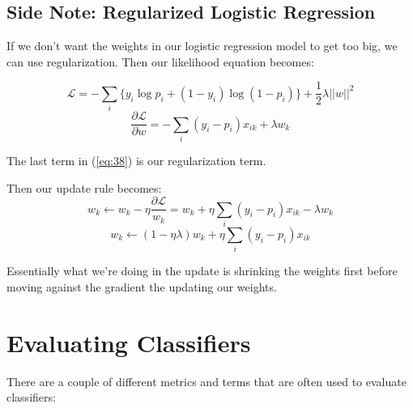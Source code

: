 \subsection{Side Note: Regularized Logistic Regression}
If we don't want the weights in our logistic regression model to get too big, we can use regularization. Then our likelihood equation becomes:

\begin{equation}\label{eq:38}
\mathcal{L} = -\sum_i \{ y_i \log p_i + (1-y_i) \log (1-p_i) \} + \frac{1}{2} \lambda ||w||^2
\end{equation}
\begin{equation}\label{eq:39}
\frac{\partial\mathcal{L}}{\partial w} = -\sum_i (y_i - p_i) x_{ik} + \lambda w_k
\end{equation}

The last term in (\ref{eq:38}) is our regularization term.

Then our update rule becomes:
\begin{equation}
w_k \leftarrow w_k - \eta \frac{\partial\mathcal{L}}{w_k} = w_k + \eta \sum_i (y_i - p_i) x_{ik} - \lambda w_k
\end{equation}
\begin{equation}
w_k \leftarrow (1-\eta\lambda)w_k + \eta \sum_i (y_i - p_i) x_{ik}
\end{equation}

Essentially what we're doing in the update is shrinking the weights first before moving against the gradient the updating our weights.

\section{Evaluating Classifiers}
There are a couple of different metrics and terms that are often used to evaluate classifiers:

